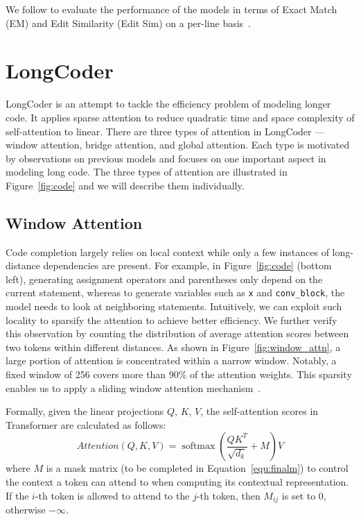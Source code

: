 \documentclass{article}
\begin{document}
We follow \citet{lu2021codexglue} to evaluate the performance of the models in terms of Exact Match (EM) and Edit Similarity (Edit Sim) on a per-line basis~\citep{svyatkovskiy2020intellicode}.





\section{LongCoder}
LongCoder is an attempt to tackle the efficiency problem of modeling longer code. It applies sparse attention to reduce quadratic time and space complexity of self-attention to linear. There are three types of attention in LongCoder --- window attention, bridge attention, and global attention. Each type is motivated by observations on previous models and focuses on one important aspect in modeling long code. The three types of attention are illustrated in Figure~\ref{fig:code} and we will describe them individually.



\subsection{Window Attention}
Code completion largely relies on local context while only a few instances of long-distance dependencies are present. For example, in Figure~\ref{fig:code} (bottom left), generating assignment operators and parentheses only depend on the current statement, whereas to generate variables such as \texttt{x} and \texttt{conv\_block}, the model needs to look at neighboring statements. Intuitively, we can exploit such locality to sparsify the attention to achieve better efficiency. We further verify this observation by counting the distribution of average attention scores between two tokens within different distances. As shown in Figure~\ref{fig:window_attn}, a large portion of attention is concentrated within a narrow window. Notably, a fixed window of 256 covers more than 90\% of the attention weights. This sparsity enables us to apply a sliding window attention mechanism~\citep{beltagy2020longformer,bigbird}.


Formally, given the linear projections $Q$, $K$, $V$, the self-attention scores in Transformer are calculated as follows:
\begin{equation}
\label{equ:attn}
\mathit{Attention}(Q,K,V) = \operatorname{softmax}(\frac{QK^T}{\sqrt{d_k}}+M)V
\end{equation}
where $M$ is a mask matrix (to be completed in Equation~\ref{equ:finalm}) to control the context a token can attend to when computing its contextual representation. If the $i$-th token is allowed to attend to the $j$-th token, then $M_{ij}$ is set to 0, otherwise  $-\infty$.
\end{document}
